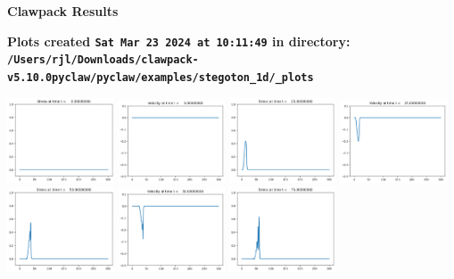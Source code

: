 \documentclass[11pt]{article}
\begin{document}
        \begin{center}{\Large\bf Clawpack Results}\vskip 5pt
        
        \bf Plots created {\tt Sat Mar 23 2024 at 10:11:49} in directory: \vskip 5pt
        \verb+/Users/rjl/Downloads/clawpack-v5.10.0pyclaw/pyclaw/examples/stegoton_1d/_plots+
        \end{center}
        \vskip 5pt
        \includegraphics[width=0.2375\textwidth]{frame0000fig1.png}
\includegraphics[width=0.2375\textwidth]{frame0000fig2.png}
\includegraphics[width=0.2375\textwidth]{frame0001fig1.png}
\includegraphics[width=0.2375\textwidth]{frame0001fig2.png}
\vskip 10pt 
\includegraphics[width=0.2375\textwidth]{frame0002fig1.png}
\includegraphics[width=0.2375\textwidth]{frame0002fig2.png}
\includegraphics[width=0.2375\textwidth]{frame0003fig1.png}
\end{document}

